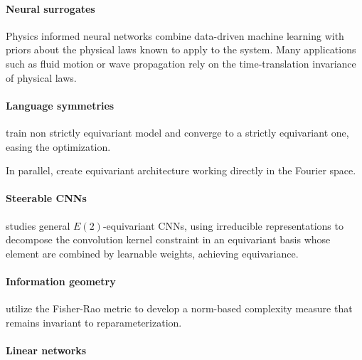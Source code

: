 \myline

\paragraph{Neural surrogates}
Physics informed neural networks \citep{raissi2019jocp} combine data-driven machine learning with priors about the physical laws known to apply to the system.
Many applications such as fluid motion or wave propagation rely on the time-translation invariance of physical laws.

\myline

\paragraph{Language symmetries}

\myline

\cite{pertigkiozoglou2024} train non strictly equivariant model and converge to a strictly equivariant one, easing the optimization.

\myline

In parallel, \cite{kondor2018,thomas2018} create equivariant architecture working directly in the Fourier space.

\myline

\paragraph{Steerable CNNs}
\cite{weiler2019anips} studies general $E(2)$-equivariant CNNs, using irreducible representations to decompose the convolution kernel constraint in an equivariant basis whose element are combined by learnable weights, achieving equivariance.

\myline

\paragraph{Information geometry}
\cite{liang2019pticais} utilize the Fisher-Rao metric to develop a norm-based complexity measure that remains invariant to reparameterization.

\myline

\paragraph{Linear networks}\cite{li2018}

